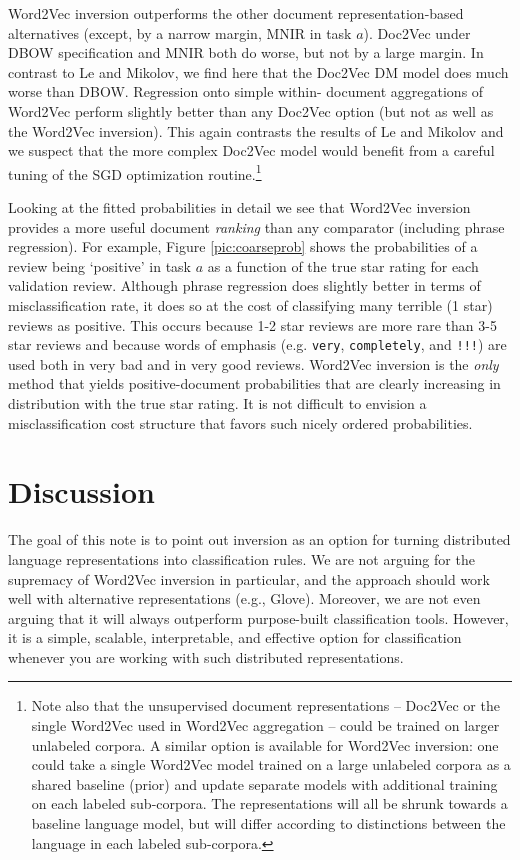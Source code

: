 \documentclass[11pt]{article}
\begin{document}
Word2Vec inversion outperforms the other document representation-based
alternatives (except, by a narrow margin, MNIR in task $a$).  Doc2Vec under
DBOW specification and MNIR both do worse, but not by a large margin. In
contrast to  Le and Mikolov, we find here that the Doc2Vec DM model does much
worse than DBOW.  Regression onto simple within- document aggregations of
Word2Vec perform slightly better than any Doc2Vec option (but not as well as
the Word2Vec inversion).  This again contrasts the results of Le and Mikolov
and we suspect that the more complex
Doc2Vec model would benefit from a careful tuning of the SGD optimization
routine.\footnote{Note also that the unsupervised document representations -- Doc2Vec or the single Word2Vec used in Word2Vec aggregation -- could be trained on larger unlabeled corpora.  A similar option is available for Word2Vec inversion: one could take a single Word2Vec model trained on a large unlabeled corpora as a shared baseline (prior) and  update separate models with additional training on each labeled sub-corpora.  The representations will all be shrunk towards a baseline language model, but will differ according to distinctions between the language in each labeled sub-corpora.}


Looking at the fitted probabilities in detail we see that Word2Vec inversion
provides a more useful document {\it ranking} than any comparator (including
phrase regression).  For example, Figure \ref{pic:coarseprob} shows the
probabilities of a review being `positive' in task $a$ as a function of the
true star rating for each validation review. Although phrase regression does
slightly better in terms of misclassification rate, it does so at the cost of
classifying many terrible (1 star) reviews as positive.  This occurs  because 1-2 star reviews are more rare than 3-5 star reviews and because words of emphasis (e.g. \texttt{very}, \texttt{completely}, and \texttt{!!!}) are used both in very bad and in very good reviews.  Word2Vec inversion is
the {\it only} method that yields positive-document probabilities that are
clearly increasing in distribution with the true star rating.  It is not
difficult to envision a misclassification cost structure that favors such
nicely ordered probabilities.


\section{Discussion}

The goal of this note is to point out inversion as an option for turning distributed language representations into classification rules.  We are not arguing for the supremacy of Word2Vec inversion in particular, and the approach should work well with alternative representations (e.g., Glove).  Moreover, we are not even arguing that it will always outperform purpose-built classification tools.  However, it is a simple, scalable, interpretable, and effective option for classification whenever you are working with such distributed representations.



\end{document}
